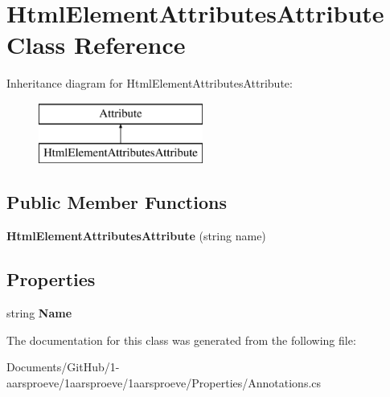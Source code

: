 \hypertarget{class_html_element_attributes_attribute}{}\section{Html\+Element\+Attributes\+Attribute Class Reference}
\label{class_html_element_attributes_attribute}
Inheritance diagram for Html\+Element\+Attributes\+Attribute\+:\begin{figure}[H]
\begin{center}
\leavevmode
\includegraphics[height=2.000000cm]{class_html_element_attributes_attribute}
\end{center}
\end{figure}
\subsection*{Public Member Functions}
\begin{DoxyCompactItemize}
\item 
\hypertarget{class_html_element_attributes_attribute_a021a9fc3f28a9025ade505f85e890810}{}{\bfseries Html\+Element\+Attributes\+Attribute} (string name)\label{class_html_element_attributes_attribute_a021a9fc3f28a9025ade505f85e890810}

\end{DoxyCompactItemize}
\subsection*{Properties}
\begin{DoxyCompactItemize}
\item 
\hypertarget{class_html_element_attributes_attribute_a6d108098ab54c1770cb01df2e1051fd7}{}string {\bfseries Name}\label{class_html_element_attributes_attribute_a6d108098ab54c1770cb01df2e1051fd7}

\end{DoxyCompactItemize}


The documentation for this class was generated from the following file\+:\begin{DoxyCompactItemize}
\item 
Documents/\+Git\+Hub/1-\/aarsproeve/1aarsproeve/1aarsproeve/\+Properties/Annotations.\+cs\end{DoxyCompactItemize}
